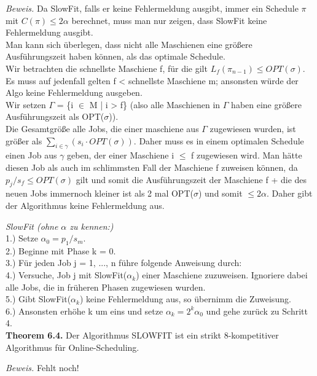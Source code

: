 \textit{Beweis.} Da SlowFit, falls er keine Fehlermeldung ausgibt, immer ein Schedule $\pi$ mit $C(\pi) \le 2 \alpha$ berechnet, muss man nur zeigen, dass SlowFit keine Fehlermeldung ausgibt.\\
Man kann sich überlegen, dass nicht alle Maschienen eine größere Ausführungszeit haben können, als das optimale Schedule. \\
Wir betrachten die schnellste Maschiene f, für die gilt $L_{f}(\pi_{n-1}) \le OPT(\sigma)$. Es muss auf jedenfall gelten f < schnellste Maschiene m; ansonsten würde der Algo keine Fehlermeldung ausgeben.\\
Wir setzen $\Gamma$ = \{i $\in$ M | i > f\} (also alle Maschienen in $\Gamma$ haben eine größere Ausführungszeit als OPT($\sigma$)).\\
Die Gesamtgröße alle Jobs, die einer maschiene aus $\Gamma$ zugewiesen wurden, ist größer als $\sum_{i \in \gamma}(s_{i} \cdot OPT(\sigma))$. Daher muss es in einem optimalen Schedule einen Job aus $\gamma$ geben, der einer Maschiene i $\le$ f zugewiesen wird. Man hätte diesen Job als auch im schlimmsten Fall der Maschiene f zuweisen können, da $p_{j}/s_{f} \le OPT(\sigma)$ gilt und somit die Ausführungszeit der Maschiene f + die des neuen Jobs immernoch kleiner ist als 2 mal OPT($\sigma$) und somit $\le 2\alpha$. Daher gibt der Algorithmus keine Fehlermeldung aus.

\textit{SlowFit (ohne $\alpha$ zu kennen:)}\\
1.) Setze $\alpha_{0} = p_{1}/s_{m}$. \\
2.) Beginne mit Phase k = 0. \\
3.) Für jeden Job j = 1, ..., n führe folgende Anweisung durch: \\
4.) Versuche, Job j mit SlowFit($\alpha_{k}$) einer Maschiene zuzuweisen. Ignoriere dabei alle Jobs, die in früheren Phasen zugewiesen wurden. \\
5.) Gibt SlowFit($\alpha_{k}$) keine Fehlermeldung aus, so übernimm die Zuweisung. \\
6.) Ansonsten erhöhe k um eins und setze $\alpha_{k} = 2^{k}\alpha_{0}$ und gehe zurück zu Schritt 4. \\


\textbf{Theorem 6.4.} Der Algorithmus SLOWFIT ist ein strikt 8-kompetitiver Algorithmus für Online-Scheduling.

\textit{Beweis.} Fehlt noch!
